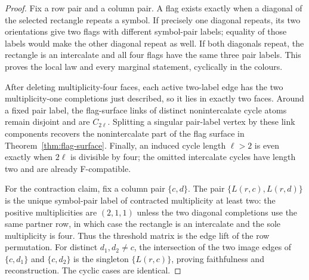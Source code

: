 \begin{proof}
Fix a row pair and a column pair.  A flag exists exactly when a diagonal of
the selected rectangle repeats a symbol.  If precisely one diagonal repeats,
its two orientations give two flags with different symbol-pair labels;
equality of those labels would make the other diagonal repeat as well.  If
both diagonals repeat, the rectangle is an intercalate and all four flags
have the same three pair labels.  This proves the local law and every
marginal statement, cyclically in the colours.

After deleting multiplicity-four faces, each active two-label edge has the
two multiplicity-one completions just described, so it lies in exactly two
faces.  Around a fixed pair label, the flag-surface links of distinct nonintercalate
cycle atoms remain disjoint and are $C_{2\ell}$.  Splitting a singular
pair-label vertex by these link components recovers the nonintercalate part
of the flag surface in Theorem~\ref{thm:flag-surface}.  Finally, an induced
cycle length $\ell>2$ is even
exactly when $2\ell$ is divisible by four; the omitted intercalate cycles
have length two and are already F-compatible.

For the contraction claim, fix a column pair $\{c,d\}$.  The pair
$\{L(r,c),L(r,d)\}$ is the unique symbol-pair label of contracted
multiplicity at least two: the positive multiplicities are $(2,1,1)$ unless
the two diagonal completions use the same partner row, in which case the
rectangle is an intercalate and the sole multiplicity is four.  Thus the
threshold matrix is the edge lift of the row permutation.  For distinct
$d_1,d_2\ne c$, the intersection of the two image edges of
$\{c,d_1\}$ and $\{c,d_2\}$ is the singleton $\{L(r,c)\}$, proving
faithfulness and reconstruction.  The cyclic cases are identical.
\end{proof}

